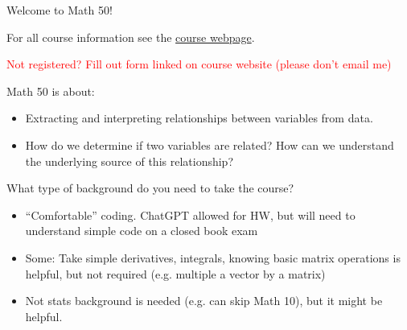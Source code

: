 \documentclass[serif,mathserif]{beamer}
\begin{document}

\begin{frame}
\centering
{\Large {Welcome to Math 50!}}
\centering

\vspace{1cm}
For all course information see the \href{https://elevien.github.io/Math50_2024/}{course webpage}.

 \vspace{1cm}
 \textcolor{red}{Not registered? Fill out form linked on course website (please don't email me)}



\end{frame}

\begin{frame}


Math 50 is about:
\begin{itemize}
\item  Extracting and interpreting relationships between variables from data. \pause
\item How do we determine if two variables are related? How can we understand the underlying source of this relationship? 
\end{itemize}
\end{frame}


\begin{frame}
What type of background do you need to take the course? \pause 
\begin{itemize}
\item ``Comfortable'' coding. ChatGPT allowed for HW, but will need to understand simple code on a closed book exam\pause 
\item Some: Take simple derivatives, integrals, knowing basic matrix operations is helpful, but not required (e.g. multiple a vector by a matrix)\pause 
\item Not stats background is needed (e.g. can skip Math 10), but it might be helpful.  
\end{itemize}
\end{frame}

%
%
%
\end{document}
